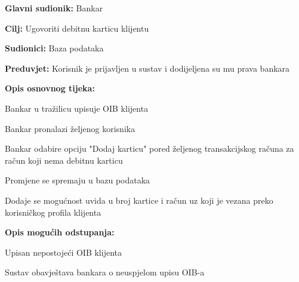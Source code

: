                 
                \noindent {}
                \begin{packed_item}
                
                  \item \textbf{Glavni sudionik: }Bankar
                  \item  \textbf{Cilj:} Ugovoriti debitnu karticu klijentu
                  \item  \textbf{Sudionici:} Baza podataka
                  \item  \textbf{Preduvjet:} Korisnik je prijavljen u sustav i dodijeljena su mu prava bankara
                  \item  \textbf{Opis osnovnog tijeka:}
                  
                  \item[] \begin{packed_enum}
                
                	\item Bankar u tražilicu upisuje OIB klijenta
                	\item Bankar pronalazi željenog korisnika
                    \item Bankar odabire opciju "Dodaj karticu" pored željenog transakcijskog računa za račun koji nema debitnu karticu
                    \item Promjene se spremaju u bazu podataka
                    \item Dodaje se mogućnost uvida u broj kartice i račun uz koji je vezana preko korisničkog profila klijenta            
                  \end{packed_enum}
                  
                  \item  \textbf{Opis mogućih odstupanja:}
                  
                  \item[] \begin{packed_item}
                
                        \item[1.a] Upisan nepostojeći OIB klijenta
                    \item[] \begin{packed_enum}
                      
                      \item Sustav obavještava bankara o neuspjelom upisu OIB-a
                      
                    \end{packed_enum}
                    
                  \end{packed_item}
                \end{packed_item}
                
